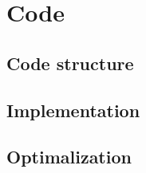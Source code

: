 \section{Code} \label{sec:code}

\subsection{Code structure} \label{sec:structure}

\subsection{Implementation} \label{sec:implementation}

\subsection{Optimalization} \label{sec:optimalization}